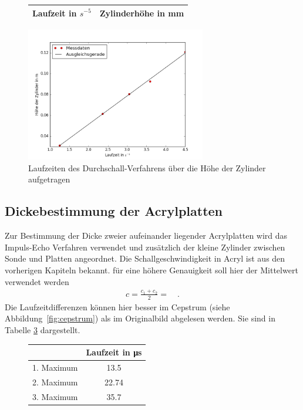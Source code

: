  
 \begin{figure}[h!]
 	\centering
 	\begin{tabular}{c|c}
 		Laufzeit in $s^{-5}$ & Zylinderhöhe in mm\\
 		\hline
 		
 	\end{tabular}
 	\label{tab:durchschall}
 \end{figure}
 
 \begin{figure}[h!]
 	\centering
 	\includegraphics[width=0.7\textwidth]{build/Durchschall.png}
 	\caption{Laufzeiten des Durchschall-Verfahrens über die Höhe der Zylinder aufgetragen}
 	\label{fig:durchschall}
 \end{figure}
 


  
  
  \clearpage
  \subsection{Dickebestimmung der Acrylplatten} 
  Zur Bestimmung der Dicke zweier aufeinander liegender Acrylplatten wird das Impuls-Echo Verfahren verwendet und zusätzlich der kleine Zylinder zwischen Sonde und Platten angeordnet. Die Schallgeschwindigkeit in Acryl ist aus den vorherigen Kapiteln bekannt. für eine höhere Genauigkeit soll hier der Mittelwert verwendet werden
  \begin{align}
  	c = \frac{c_1+ c_2}{2} =  \quad .
  \end{align}
  Die Laufzeitdifferenzen können hier besser im Cepstrum (siehe Abbildung~\ref{fig:cepstrum}) als im Originalbild abgelesen werden. Sie sind in Tabelle \ref{tab:laufzeiten_platte} dargestellt.
  
   \begin{figure}[h!]
   	\centering
   	\begin{tabular}{c|c}
   	 & Laufzeit in \si{\micro\second}\\
   		\hline
   	1. Maximum & 13.5 \\
   	2. Maximum & 22.74 \\
   	3. Maximum & 35.7 \\
   	\end{tabular}
   	\label{tab:laufzeiten_platte}
   \end{figure}
  
